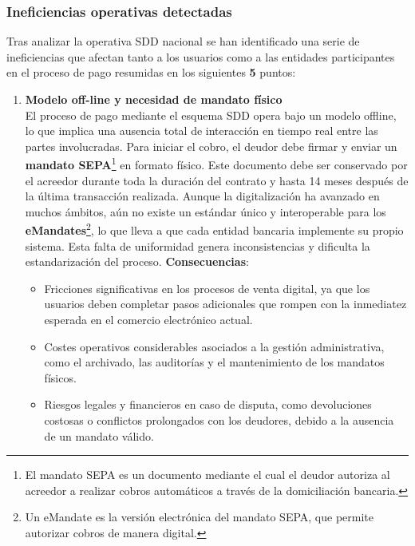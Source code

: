 \subsubsection{Ineficiencias operativas detectadas}

Tras analizar la operativa SDD nacional se han identificado una serie de ineficiencias que afectan tanto a los usuarios como a las entidades participantes en el proceso de pago resumidas en los siguientes \textbf{5} puntos:
\begin{enumerate}[label=\textbf{\arabic*.}, leftmargin=0.75cm]
      \item \textbf{Modelo off-line y necesidad de mandato físico}\\
            El proceso de pago mediante el esquema SDD opera bajo un modelo offline, lo que implica una ausencia total de interacción en tiempo real entre las partes involucradas. Para iniciar el cobro, el deudor debe firmar y enviar un \textbf{mandato SEPA}\footnote{El mandato SEPA es un documento mediante el cual el deudor autoriza al acreedor a realizar cobros automáticos a través de la domiciliación bancaria.} en formato físico. Este documento debe ser conservado por el acreedor durante toda la duración del contrato y hasta 14 meses después de la última transacción realizada. Aunque la digitalización ha avanzado en muchos ámbitos, aún no existe un estándar único y interoperable para los \textbf{eMandates}\footnote{Un eMandate es la versión electrónica del mandato SEPA, que permite autorizar cobros de manera digital.}, lo que lleva a que cada entidad bancaria implemente su propio sistema. Esta falta de uniformidad genera inconsistencias y dificulta la estandarización del proceso.
            \textbf{Consecuencias}:
      \begin{itemize}
            \item Fricciones significativas en los procesos de venta digital, ya que los usuarios deben completar pasos adicionales que rompen con la inmediatez esperada en el comercio electrónico actual.
            \item Costes operativos considerables asociados a la gestión administrativa, como el archivado, las auditorías y el mantenimiento de los mandatos físicos.
            \item Riesgos legales y financieros en caso de disputa, como devoluciones costosas o conflictos prolongados con los deudores, debido a la ausencia de un mandato válido.
      \end{itemize}


\end{enumerate}
